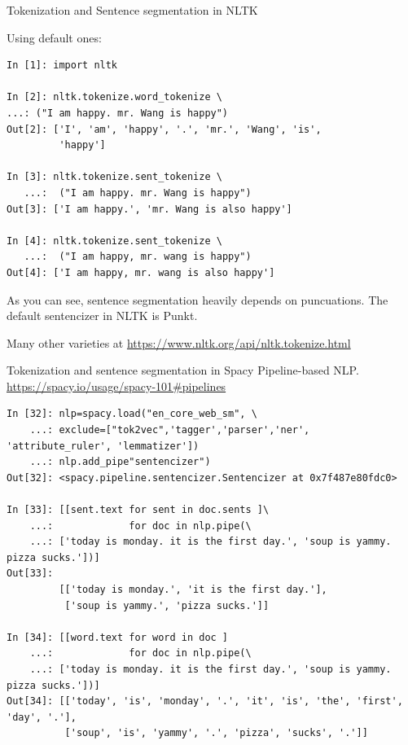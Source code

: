 \documentclass[11pt, handout]{beamer}
\begin{document}
\begin{frame}{Tokenization and Sentence segmentation in NLTK}

  Using default ones: 

 \begin{verbatim}
In [1]: import nltk 

In [2]: nltk.tokenize.word_tokenize \ 
...: ("I am happy. mr. Wang is happy")
Out[2]: ['I', 'am', 'happy', '.', 'mr.', 'Wang', 'is', 
         'happy']

In [3]: nltk.tokenize.sent_tokenize \
   ...:  ("I am happy. mr. Wang is happy")
Out[3]: ['I am happy.', 'mr. Wang is also happy']

In [4]: nltk.tokenize.sent_tokenize \
   ...:  ("I am happy, mr. wang is happy")
Out[4]: ['I am happy, mr. wang is also happy']
 \end{verbatim}

As you can see, sentence segmentation heavily depends on puncuations. The default sentencizer in NLTK is Punkt. 

Many other varieties at \url{https://www.nltk.org/api/nltk.tokenize.html}
\end{frame}

\begin{frame}[fragile]{Tokenization and sentence segmentation in Spacy}
Pipeline-based NLP. \url{https://spacy.io/usage/spacy-101#pipelines}

  \tiny
  \begin{verbatim}
In [32]: nlp=spacy.load("en_core_web_sm", \
    ...: exclude=["tok2vec",'tagger','parser','ner', 'attribute_ruler', 'lemmatizer'])
    ...: nlp.add_pipe"sentencizer")        
Out[32]: <spacy.pipeline.sentencizer.Sentencizer at 0x7f487e80fdc0>

In [33]: [[sent.text for sent in doc.sents ]\
    ...:             for doc in nlp.pipe(\ 
    ...: ['today is monday. it is the first day.', 'soup is yammy. pizza sucks.'])]
Out[33]:
         [['today is monday.', 'it is the first day.'], 
          ['soup is yammy.', 'pizza sucks.']]

In [34]: [[word.text for word in doc ]
    ...:             for doc in nlp.pipe(\ 
    ...: ['today is monday. it is the first day.', 'soup is yammy. pizza sucks.'])]
Out[34]: [['today', 'is', 'monday', '.', 'it', 'is', 'the', 'first', 'day', '.'], 
          ['soup', 'is', 'yammy', '.', 'pizza', 'sucks', '.']]
  \end{verbatim} 
\end{frame}
\end{document}
